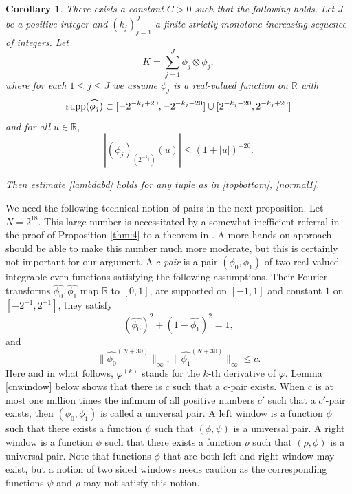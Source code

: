 \documentclass[12pt,reqno]{amsart}
\theoremstyle{plain}
\newtheorem{corollary}[theorem]{Corollary}
\theoremstyle{definition}
\numberwithin{equation}{section}
\newcommand{\R}{{\mathbb R}}
\begin{document}
\begin{corollary}
\label{cor:1}
There exists a constant  $C>0$ such that the following holds. 
Let $J$ be a positive integer and   $(k_j)_{j=1}^J$ 
 a finite strictly monotone increasing sequence of integers. Let
\[K =\sum_{j=1}^J \phi_j\otimes \phi_j,\]
where for each $1\le j\le J$ we assume 
$\phi_j$ is a real-valued function on $\R$ with
\begin{equation*}%
{\rm supp} (\widehat{\phi_j})\subset 
[-2^{-k_j+20},-2^{-k_j-20}]\cup [2^{-k_j-20},2^{-k_j+20}]
\end{equation*}  
and for all $u\in \R$,
\begin{equation*}%
|(\phi_j)_{(2^{-k_j})}(u)| \leq  (1+|u|)^{-20}.
\end{equation*}

Then estimate \eqref{lambdabd} holds for any tuple as in \eqref{topbottom}, \eqref{normal1}.
\end{corollary}

 




We need the following technical notion of pairs in the next proposition. Let $N=2^{18}$. This large number
 is necessitated by a somewhat
inefficient referral in the proof of Proposition \ref{thm:4} to a theorem in \cite{MR4510172}.
A more hands-on approach should be able to
make this number much more moderate, but this is certainly not important for our argument.
A  {\em $c$-pair} is a pair $(\phi_0,\phi_1)$ of two real valued integrable even functions satisfying the following assumptions. Their Fourier transforms $\widehat{\phi_0},\widehat{\phi_1}$ map
$\R$ to $[0,1]$,
are supported on $[-1,1]$ and constant $1$ on
$[-2^{-1}, 2^{-1}]$, they satisfy 
\begin{equation}\label{windowsum}
(\widehat{\phi_0})^2+(1-\widehat{\phi_1})^2=1,
\end{equation}
 and
\begin{equation*}%
\|\widehat{\phi_0}^{(N+30)}\|_\infty , \|\widehat{\phi_1}^{(N+30)}\|_\infty\le c  .   
\end{equation*}
Here and in what follows, $\varphi^{(k)}$ stands for the $k$-th derivative of $\varphi$.
Lemma \ref{cnwindow} below shows that there is $c$ such that
a $c$-pair exists. When $c$ is at most one million
times the infimum of all positive numbers $c'$ such that a
$c'$-pair exists, then $(\phi_0,\phi_1)$ is called a 
universal pair.
A left window is a function $\phi$ such that there exists a function
$\psi$ such that $(\phi,\psi)$ is a universal pair. A right window
is a function $\phi$ such that there exists a function $\rho$
such that $(\rho,\phi)$ is a universal pair.
Note that functions $\phi$ that are both left and right window may exist, but a notion of two sided windows needs caution
as the corresponding functions $\psi$ and $\rho$ may not satisfy 
this notion.
\end{document}
